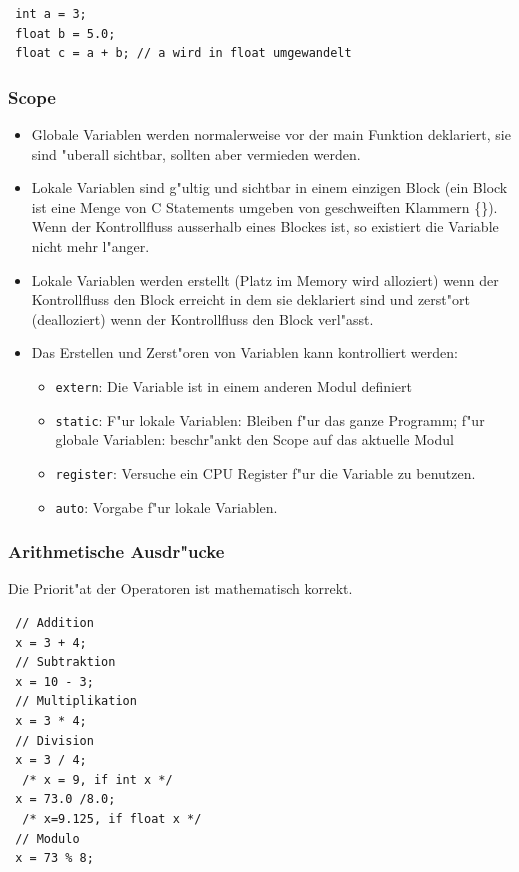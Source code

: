 \documentclass[german, 10pt, a4paper, twocolumn]{scrartcl}
\begin{document}
\begin{verbatim}
 int a = 3;
 float b = 5.0;
 float c = a + b; // a wird in float umgewandelt
\end{verbatim}

\subsubsection{Scope}

\begin{itemize}
	\item Globale Variablen werden normalerweise vor der main Funktion deklariert, sie sind "uberall sichtbar, sollten aber vermieden werden.
	\item Lokale Variablen sind g"ultig und sichtbar in einem einzigen Block (ein Block ist eine Menge von C Statements umgeben von geschweiften Klammern \{\}). Wenn der Kontrollfluss ausserhalb eines Blockes ist, so existiert die Variable nicht mehr l"anger.
	\item Lokale Variablen werden erstellt (Platz im Memory wird alloziert) wenn der Kontrollfluss den Block erreicht in dem sie deklariert sind und zerst"ort (dealloziert) wenn der Kontrollfluss den Block verl"asst.
	\item Das Erstellen und Zerst"oren von Variablen kann kontrolliert werden:
		\begin{itemize}
			\item \verb#extern#: Die Variable ist in einem anderen Modul definiert
			\item \verb#static#: F"ur lokale Variablen: Bleiben f"ur das ganze Programm; f"ur globale Variablen: beschr"ankt den Scope auf das aktuelle Modul
			\item \verb#register#: Versuche ein CPU Register f"ur die Variable zu benutzen.
			\item \verb#auto#: Vorgabe f"ur lokale Variablen.
		\end{itemize}
\end{itemize}

\subsubsection{Arithmetische Ausdr"ucke}

Die Priorit"at der Operatoren ist mathematisch korrekt.

\begin{verbatim}
 // Addition
 x = 3 + 4;
 // Subtraktion
 x = 10 - 3;
 // Multiplikation
 x = 3 * 4;
 // Division
 x = 3 / 4;
  /* x = 9, if int x */
 x = 73.0 /8.0;
  /* x=9.125, if float x */
 // Modulo
 x = 73 % 8;
\end{verbatim}
\end{document}
